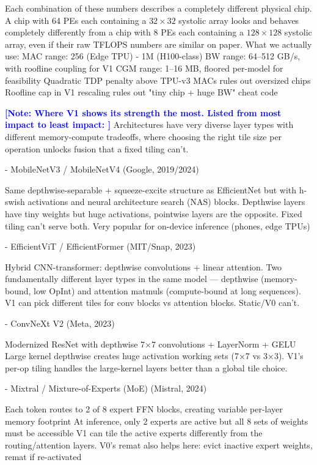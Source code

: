 \documentclass{article}
\renewcommand{\mnote}[1]{\textcolor{blue}{\textbf{[Note: #1]}}}
\begin{document}
Each combination of these numbers describes a completely different physical chip.
A chip with 64 PEs each containing a $32 \times 32$ systolic array looks and behaves
completely differently from a chip with 8 PEs each containing a $128 \times 128$
systolic array, even if their raw TFLOPS numbers are similar on paper. What we actually use: MAC range: 256 (Edge TPU) - 1M (H100-class)
BW range: 64–512 GB/s, with roofline coupling for V1
CGM range: 1–16 MB, floored per-model for feasibility
Quadratic TDP penalty above TPU-v3 MACs rules out oversized chips
Roofline cap in V1 rescaling rules out "tiny chip + huge BW" cheat code

\mnote{Where V1 shows its strength the most. Listed from most impact to least impact: } Architectures have very diverse layer types with different memory-compute tradeoffs, where choosing the right tile size per operation unlocks fusion that a fixed tiling can't.

- MobileNetV3 / MobileNetV4 (Google, 2019/2024)

Same depthwise-separable + squeeze-excite structure as EfficientNet but with h-swish activations and neural architecture search (NAS) blocks. Depthwise layers have tiny weights but huge activations, pointwise layers are the opposite. Fixed tiling can't serve both.
Very popular for on-device inference (phones, edge TPUs)

- EfficientViT / EfficientFormer (MIT/Snap, 2023)

Hybrid CNN-transformer: depthwise convolutions + linear attention. Two fundamentally different layer types in the same model — depthwise (memory-bound, low OpInt) and attention matmuls (compute-bound at long sequences). V1 can pick different tiles for conv blocks vs attention blocks. Static/V0 can't.


- ConvNeXt V2 (Meta, 2023)

Modernized ResNet with depthwise 7×7 convolutions + LayerNorm + GELU
Large kernel depthwise creates huge activation working sets (7×7 vs 3×3). V1's per-op tiling handles the large-kernel layers better than a global tile choice.

- Mixtral / Mixture-of-Experts (MoE) (Mistral, 2024)

Each token routes to 2 of 8 expert FFN blocks, creating variable per-layer memory footprint
At inference, only 2 experts are active but all 8 sets of weights must be accessible
V1 can tile the active experts differently from the routing/attention layers. V0's remat also helps here: evict inactive expert weights, remat if re-activated
\end{document}
